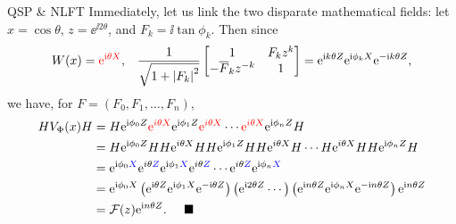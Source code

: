 \begin{frame}{QSP \& NLFT}
    Immediately, let us link the two disparate mathematical fields: let $x=\cos\theta$, $z = \ee^{\ii2\theta}$, and $F_k = \ii\tan\phi_k$. Then since
    \begin{align}
        &W(x) = {\color{red}\mathrm{e}^{\mathrm{i}\theta X}}, & \frac{1}{\sqrt{1+\left|{F_k}\right|^2}}\left[\begin{matrix}
            1 & F_kz^k \\ -\overline{F}_kz^{-k} & 1
        \end{matrix}\right] = \mathrm{e}^{\mathrm{i} k\theta Z} \mathrm{e}^{\mathrm{i}\phi_kX} \mathrm{e}^{-\mathrm{i} k\theta Z},
    \end{align}
    we have, for $F=(F_0,F_1,\ldots,F_n)$,
    \begin{align*}
        H V_\Phi(x) H &= H \mathrm{e}^{\mathrm{i}\phi_0Z} {\color{red}\mathrm{e}^{i\theta X}} \mathrm{e}^{\mathrm{i}\phi_1Z} {\color{red}\mathrm{e}^{i\theta X}} \cdots {\color{red}\mathrm{e}^{i\theta X}} \mathrm{e}^{\mathrm{i}\phi_nZ} H \\
        &= H \mathrm{e}^{\mathrm{i}\phi_0Z} HH \mathrm{e}^{i\theta X} HH \mathrm{e}^{\mathrm{i}\phi_1Z} HH \mathrm{e}^{i\theta X} H\cdots H \mathrm{e}^{i\theta X} HH \mathrm{e}^{\mathrm{i}\phi_nZ} H \\
        &= \mathrm{e}^{\mathrm{i}\phi_0\color{blue}X} \mathrm{e}^{i\theta \color{blue}Z} \mathrm{e}^{\mathrm{i}\phi_1\color{blue}X} \mathrm{e}^{i\theta \color{blue}Z} \cdots \mathrm{e}^{i\theta \color{blue}Z} \mathrm{e}^{\mathrm{i}\phi_n\color{blue}X} \\
        &= \mathrm{e}^{\mathrm{i}\phi_0X}\left(\mathrm{e}^{\mathrm{i}\theta Z} \mathrm{e}^{\mathrm{i}\phi_1X} \mathrm{e}^{-\mathrm{i}\theta Z}\right) \left(\mathrm{e}^{\mathrm{i}2\theta Z} \cdots\right) \left(\mathrm{e}^{\mathrm{i} n\theta Z} \mathrm{e}^{\mathrm{i}\phi_nX}\mathrm{e}^{-\mathrm{i} n\theta Z}\right) \mathrm{e}^{\mathrm{i} n\theta Z} \\
        &= \mathcal{F}(z) \mathrm{e}^{\mathrm{i} n\theta Z}. \;\;\;\;\;\blacksquare
    \end{align*}
\end{frame}


